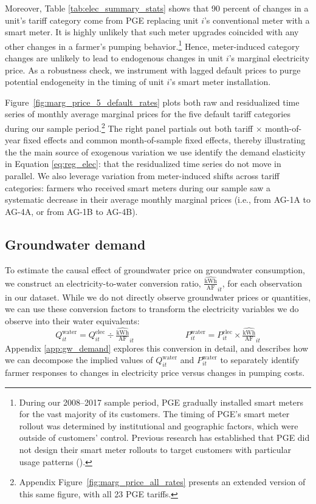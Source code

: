 Moreover, Table \ref{tab:elec_summary_stats} shows that 90 percent of changes in a unit's tariff category come from PGE replacing unit $i$'s conventional meter with a smart meter. It is highly unlikely that such meter upgrades coincided with any other changes in a farmer's pumping behavior.\footnote{
During our 2008--2017 sample period, PGE gradually installed smart meters for the vast majority of its customers. The timing of PGE's smart meter rollout was determined by institutional and geographic factors, which were outside of customers' control. Previous research has established that PGE did not design their smart meter rollouts to target customers with particular usage patterns (\textcite{blonz2016}).} Hence, meter-induced category changes are unlikely to lead to endogenous changes in unit $i$'s marginal electricity price. As a robustness check, we instrument with lagged default prices to purge potential endogeneity in the timing of unit $i$'s smart meter installation.

Figure~\ref{fig:marg_price_5_default_rates} plots both raw and residualized time series of monthly average marginal prices for the five default tariff categories during our sample period.\footnote{Appendix Figure~\ref{fig:marg_price_all_rates} presents an extended version of this same figure, with all 23 PGE tariffs.} The right panel partials out both tariff $\times$ month-of-year fixed effects and common month-of-sample fixed effects, thereby illustrating the the main source of exogenous variation we use identify the demand elasticity in Equation \ref{eq:reg_elec}: that the residualized time series do not move in parallel. We also leverage variation from meter-induced shifts across tariff categories: farmers who received smart meters during our sample saw a systematic decrease in their average monthly marginal prices (i.e., from AG-1A to AG-4A, or from AG-1B to AG-4B).

\subsection{Groundwater demand}\label{sec:empirics_water}
To estimate the causal effect of groundwater price on groundwater consumption, we construct an electricity-to-water conversion ratio, $\widehat{\tfrac{{\text{kWh}}}{\text{AF}}}_{it}$, for each observation in our dataset. While we do not directly observe groundwater prices or quantities, we can use these conversion factors to transform the electricity variables we do observe into their water equivalents:
\begin{equation}
Q^{\text{water}}_{it} = Q^{\text{elec}}_{it} \div  \widehat{\tfrac{{\text{kWh}}}{\text{AF}}}_{it}
\qquad \qquad \qquad 
P^{\text{water}}_{it} = P^{\text{elec}}_{it} \times  \widehat{\tfrac{{\text{kWh}}}{\text{AF}}}_{it}
\label{eq:q_water}
\end{equation}
Appendix \ref{app:gw_demand} explores this conversion in detail, and describes how we can decompose the implied values of $Q^{\text{water}}_{it}$ and ${P}^{\text{water}}_{it}$ to separately identify farmer responses to changes in electricity price versus changes in pumping costs.

